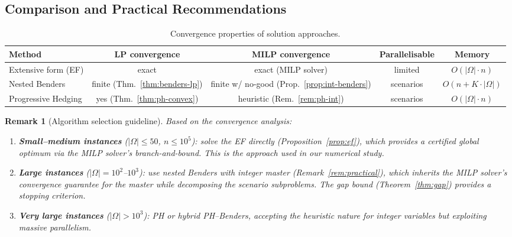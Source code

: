 \documentclass[11pt]{article}
\newtheorem{remark}{Remark}
\begin{document}
\subsection{Comparison and Practical Recommendations}
\label{sec:algo-compare}

\begin{table}[H]
\centering
\caption{Convergence properties of solution approaches.}
\label{tab:convergence}
\small
\begin{tabular}{lcccc}
\toprule
\textbf{Method} & \textbf{LP convergence}
  & \textbf{MILP convergence}
  & \textbf{Parallelisable}
  & \textbf{Memory} \\
\midrule
Extensive form (EF) & exact & exact (MILP solver)
  & limited & $O(|\Omega| \cdot n)$ \\
Nested Benders & finite (Thm.~\ref{thm:benders-lp})
  & finite w/ no-good (Prop.~\ref{prop:int-benders})
  & scenarios & $O(n + K \cdot |\Omega|)$ \\
Progressive Hedging & yes (Thm.~\ref{thm:ph-convex})
  & heuristic (Rem.~\ref{rem:ph-int})
  & scenarios & $O(|\Omega| \cdot n)$ \\
\bottomrule
\end{tabular}
\end{table}

\begin{remark}[Algorithm selection guideline]\label{rem:selection}
Based on the convergence analysis:
\begin{enumerate}[nosep]
  \item \textbf{Small--medium instances}
    ($|\Omega| \leq 50$, $n \leq 10^5$):
    solve the EF directly (Proposition~\ref{prop:ef}), which provides
    a certified global optimum via the MILP solver's branch-and-bound.
    This is the approach used in our numerical study.
  \item \textbf{Large instances}
    ($|\Omega| = 10^2$--$10^3$):
    use nested Benders with integer master
    (Remark~\ref{rem:practical}), which inherits the MILP solver's
    convergence guarantee for the master while decomposing the
    scenario subproblems. The gap bound
    (Theorem~\ref{thm:gap}) provides a stopping criterion.
  \item \textbf{Very large instances}
    ($|\Omega| > 10^3$):
    PH or hybrid PH--Benders, accepting the heuristic nature for
    integer variables but exploiting massive parallelism.
\end{enumerate}
\end{remark}
\end{document}
